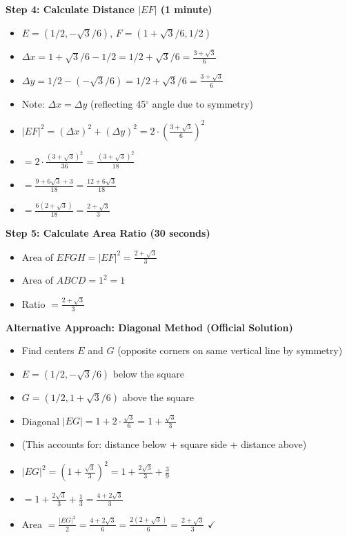 \documentclass[]{article}
\begin{document}
\begin{solutionbox}
\textbf{Step 4: Calculate Distance $|EF|$ (1 minute)}
\begin{itemize}[leftmargin=*]
    \item $E = (1/2, -\sqrt{3}/6)$, $F = (1 + \sqrt{3}/6, 1/2)$
    \item $\Delta x = 1 + \sqrt{3}/6 - 1/2 = 1/2 + \sqrt{3}/6 = \frac{3+\sqrt{3}}{6}$
    \item $\Delta y = 1/2 - (-\sqrt{3}/6) = 1/2 + \sqrt{3}/6 = \frac{3+\sqrt{3}}{6}$
    \item Note: $\Delta x = \Delta y$ (reflecting 45$^\circ$ angle due to symmetry)
    \item $|EF|^2 = (\Delta x)^2 + (\Delta y)^2 = 2 \cdot \left(\frac{3+\sqrt{3}}{6}\right)^2$
    \item $= 2 \cdot \frac{(3+\sqrt{3})^2}{36} = \frac{(3+\sqrt{3})^2}{18}$
    \item $= \frac{9 + 6\sqrt{3} + 3}{18} = \frac{12 + 6\sqrt{3}}{18}$
    \item $= \frac{6(2 + \sqrt{3})}{18} = \frac{2 + \sqrt{3}}{3}$
\end{itemize}

\textbf{Step 5: Calculate Area Ratio (30 seconds)}
\begin{itemize}[leftmargin=*]
    \item Area of $EFGH = |EF|^2 = \frac{2+\sqrt{3}}{3}$
    \item Area of $ABCD = 1^2 = 1$
    \item Ratio $= \frac{2+\sqrt{3}}{3}$
\end{itemize}

\textbf{Alternative Approach: Diagonal Method (Official Solution)}
\begin{itemize}[leftmargin=*]
    \item Find centers $E$ and $G$ (opposite corners on same vertical line by symmetry)
    \item $E = (1/2, -\sqrt{3}/6)$ below the square
    \item $G = (1/2, 1+\sqrt{3}/6)$ above the square
    \item Diagonal $|EG| = 1 + 2 \cdot \frac{\sqrt{3}}{6} = 1 + \frac{\sqrt{3}}{3}$
    \item (This accounts for: distance below + square side + distance above)
    \item $|EG|^2 = \left(1 + \frac{\sqrt{3}}{3}\right)^2 = 1 + \frac{2\sqrt{3}}{3} + \frac{3}{9}$
    \item $= 1 + \frac{2\sqrt{3}}{3} + \frac{1}{3} = \frac{4 + 2\sqrt{3}}{3}$
    \item Area $= \frac{|EG|^2}{2} = \frac{4 + 2\sqrt{3}}{6} = \frac{2(2 + \sqrt{3})}{6} = \frac{2+\sqrt{3}}{3}$ $\checkmark$
\end{itemize}


\end{solutionbox}
\end{document}
